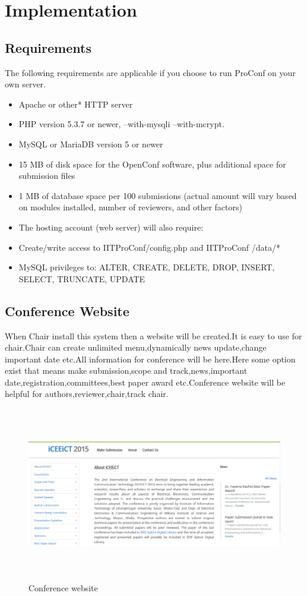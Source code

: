 \chapter{Implementation}

\section{Requirements}
The following requirements are applicable if you choose to run ProConf on your own server.

\begin{itemize}
  \item Apache or other* HTTP server
  \item PHP version 5.3.7 or newer, --with-mysqli --with-mcrypt.\cite{ref5}
  \item MySQL or MariaDB version 5 or newer
  \item 15 MB of disk space for the OpenConf software, plus additional space for submission files
  \item	1 MB of database space per 100 submissions (actual amount will vary based on modules installed, number of reviewers, and other factors)
  \item	The hosting account (web server) will also require:
  \item Create/write access to IITProConf/config.php and IITProConf /data/*
  \item MySQL privileges to: ALTER, CREATE, DELETE, DROP, INSERT, SELECT, TRUNCATE, UPDATE
\end{itemize}

\section{Conference Website}
When Chair  install this system then a website will be created.It is easy to use for chair.Chair can create unlimited menu,dynamically news update,change important date etc.All information for conference will be here.Here some option exist that means make submission,scope and track,news,important date,registration,committees,best paper award etc.Conference website will be helpful for authors,reviewer,chair,track chair.


\begin{figure}[h!]
\centering
  \includegraphics[width=5in,height=3in]{pic/all}
   \caption{Conference website}\label{conference}
\end{figure}




